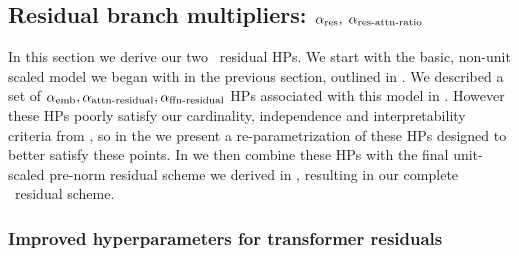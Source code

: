 





\subsection{Residual branch multipliers: $\alpha_{\mathrm{res}}, \; \alpha_{\mathrm{res{\text -}attn{\text -}ratio}}$}
\label{subsec:residual_branch_multipliers}

In this section we derive our two \umup\ residual HPs. We start with the basic, non-unit scaled model we began with in the previous section, outlined in . We described a set of $\alpha_{\mathrm{emb}}, \alpha_{\mathrm{attn{\text -}residual}}, \alpha_{\mathrm{ffn{\text -}residual}}$ HPs associated with this model in . However these HPs poorly satisfy our cardinality, independence and interpretability criteria from , so in the  we present a re-parametrization of these HPs designed to better satisfy these points. In  we then combine these HPs with the final unit-scaled pre-norm residual scheme we derived in , resulting in our complete \umup\ residual scheme.

\subsubsection{Improved hyperparameters for transformer residuals} \label{subsubsec:improved_residual_HPs}

